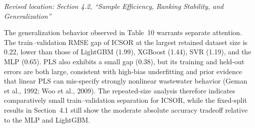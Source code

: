 \documentclass[11pt,a4paper]{article}
\newcommand{\excerptlocation}[1]{\par\noindent\textit{Revised location: #1}\par}
\begin{document}
\excerptlocation{Section 4.2, ``Sample Efficiency, Ranking Stability, and Generalization''}
\begin{revisionexcerpt}
The generalization behavior observed in Table~10 warrants separate attention. The train--validation RMSE gap of ICSOR at the largest retained dataset size is 0.22, lower than those of LightGBM (1.99), XGBoost (1.44), SVR (1.19), and the MLP (0.65). PLS also exhibits a small gap (0.38), but its training and held-out errors are both large, consistent with high-bias underfitting and prior evidence that linear PLS can mis-specify strongly nonlinear wastewater behavior (Geman et al., 1992; Woo et al., 2009). The repeated-size analysis therefore indicates comparatively small train--validation separation for ICSOR, while the fixed-split results in Section~4.1 still show the moderate absolute accuracy tradeoff relative to the MLP and LightGBM.
\end{revisionexcerpt}
\end{document}
